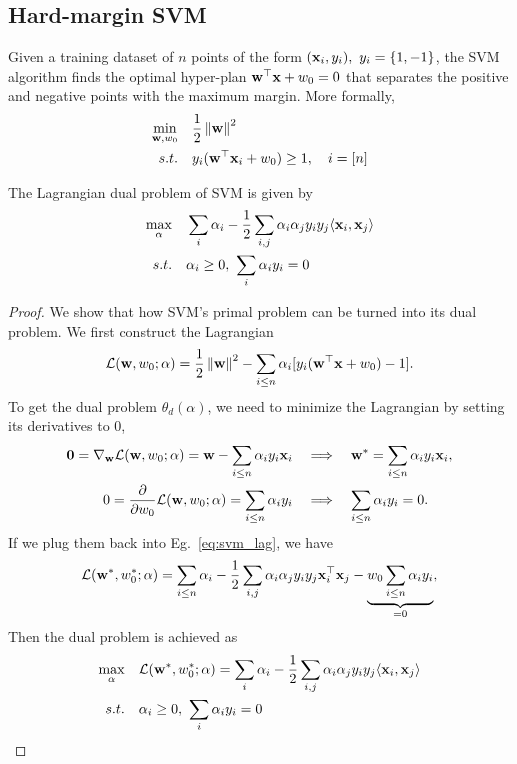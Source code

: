 \subsection{Hard-margin SVM}
\begin{definition}
Given a training dataset of $n$ points of the form $(\mathbf{x}_i, y_i), \ y_i = \{1, -1\}$, the SVM algorithm finds the optimal hyper-plan $\mathbf{w}^\top \mathbf{x} + w_0 = 0$ that separates the positive and negative points with the maximum margin. More formally,
\begin{align}
	\min_{\mathbf{w}, w_0} & \quad \frac{1}{2} \left\lVert \mathbf{w} \right\rVert^2  \\
	s.t. & \quad y_i (\mathbf{w}^\top \mathbf{x}_i + w_0) \geq 1, \quad i = [n]
\end{align}
\end{definition}
\begin{definition}
The Lagrangian dual problem of SVM is given by
\begin{align}
	\max_{\alpha} & \quad \sum_{i} \alpha_i - \frac{1}{2} \sum_{i,j} \alpha_i \alpha_j y_i y_j \langle \mathbf{x}_i, \mathbf{x}_j \rangle  \\
	s.t. & \quad \alpha_i \geq 0,\ \sum_{i} \alpha_i y_i = 0
\end{align}
\end{definition}
\begin{proof}
	We show that how SVM's primal problem can be turned into its dual problem. We first construct the Lagrangian
	\begin{equation}
		\mathcal{L}(\mathbf{w}, w_0; \alpha) = \frac{1}{2} \left\lVert \mathbf{w} \right\rVert^2 - \sum_{i \leq n} \alpha_i [y_i(\mathbf{w}^\top \mathbf{x} + w_0) - 1].\label{eq:svm_lag}
	\end{equation}
	To get the dual problem $\theta_d(\alpha)$, we need to minimize the Lagrangian by setting its derivatives to $0$,
	\begin{align}
		\mathbf{0} = \nabla_{\mathbf{w}} \mathcal{L}(\mathbf{w}, w_0; \alpha) = \mathbf{w} - \sum_{i \leq n} \alpha_i y_i \mathbf{x}_i \quad & \Longrightarrow\quad \mathbf{w}^* = \sum_{i \leq n} \alpha_i y_i \mathbf{x}_i, \\
		{0} = \frac{\partial}{\partial w_0} \mathcal{L}(\mathbf{w}, w_0; \alpha) = \sum_{i \leq n} \alpha_i y_i \quad & \Longrightarrow\quad  \sum_{i \leq n} \alpha_i y_i = 0.	
	\end{align}
	If we plug them back into Eg.~\ref{eq:svm_lag}, we have
	\begin{equation}
		\mathcal{L}(\mathbf{w}^*, w_0^*; \alpha) = \sum_{i \leq n} \alpha_i - \frac{1}{2} \sum_{i, j} \alpha_i \alpha_j y_i y_j \mathbf{x}_i^\top \mathbf{x}_j - \underbrace{w_0 \sum_{i \leq n} \alpha_i y_i}_{=0},
	\end{equation}
	Then the dual problem is achieved as
	\begin{align}
	\max_{\alpha} & \quad \mathcal{L}(\mathbf{w}^*, w_0^*; \alpha) = \sum_{i} \alpha_i - \frac{1}{2} \sum_{i,j} \alpha_i \alpha_j y_i y_j \langle \mathbf{x}_i, \mathbf{x}_j \rangle  \\
	s.t. & \quad \alpha_i \geq 0,\ \sum_{i} \alpha_i y_i = 0
\end{align}
\end{proof}

